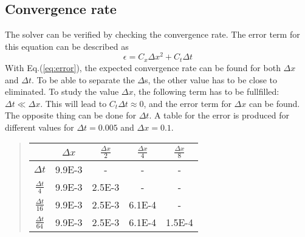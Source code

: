 \documentclass[%
twoside,                 %
final,                   %
chapterprefix=true,      %
open=right               %
10pt]{book}
\begin{document}
\subsection{Convergence rate}
The solver can be verified by checking the convergence rate. The error term  for this equation can be described as  
\begin{equation} \label{eq:error}
    \epsilon = C_x\Delta x^2 + C_t \Delta t
\end{equation}
With Eq.(\ref{eq:error}), the expected convergence rate can be found for both $\Delta x$ and $\Delta t$. To be able to separate the $\Delta$s, the other value has to be close to eliminated. To study the value $\Delta x$, the following term has to be fullfilled: $\Delta t \ll \Delta x$. This will lead to $C_t\Delta t \approx 0$, and the error term for $\Delta x$ can be found. The opposite thing can  be done for $\Delta t$. A table for the error is produced for different values for $\Delta t = 0.005$ and $\Delta x=0.1$.

\label{table:error_numbers}

\begin{quote}
\begin{tabular}{ccccc}
\hline
\multicolumn{1}{c}{  } & \multicolumn{1}{c}{ $\Delta x$ } & \multicolumn{1}{c}{ $\frac{\Delta x}{2}$ } & \multicolumn{1}{c}{ $\frac{\Delta x}{4}$ } & \multicolumn{1}{c}{ $\frac{\Delta x}{8}$ } \\
\hline
$\Delta t     $       & 9.9E-3     & -                    & -                    & -                    \\
$\frac{\Delta t}{4} $ & 9.9E-3     & 2.5E-3               & -                    & -                    \\
$\frac{\Delta t}{16}$ & 9.9E-3     & 2.5E-3               & 6.1E-4               & -                    \\
$\frac{\Delta t}{64}$ & 9.9E-3     & 2.5E-3               & 6.1E-4               & 1.5E-4               \\
\hline
\end{tabular}
\end{quote}

\noindent
\end{document}
